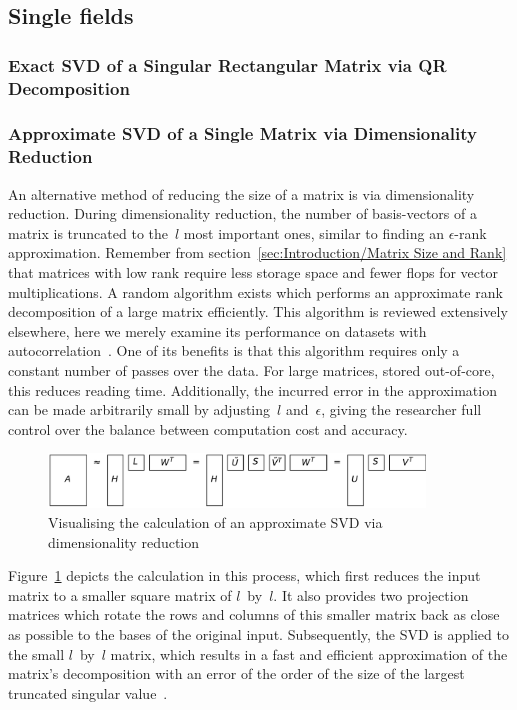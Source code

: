 \documentclass[ijgi,article,submit,moreauthors,pdftex,10pt,a4paper]{Definitions/mdpi}
\begin{document}
\subsection{Single fields}

\subsubsection{Exact SVD of a Singular Rectangular Matrix via QR Decomposition}

\subsubsection{Approximate SVD of a Single Matrix via Dimensionality Reduction}
\label{sec:Results/Approximate SVD of a Single Matrix via Dimensionality Reduction}
An alternative method of reducing the size of a matrix is via dimensionality reduction. During dimensionality reduction, the number of basis-vectors of a matrix is truncated to the~$l$ most important ones, similar to finding an $\epsilon$-rank approximation. Remember from section~\ref{sec:Introduction/Matrix Size and Rank} that matrices with low rank require less storage space and fewer flops for vector multiplications. A random algorithm exists which performs an approximate rank decomposition of a large matrix efficiently. This algorithm is reviewed extensively elsewhere, here we merely examine its performance on datasets with autocorrelation~\cite{Halko2011, Li2016}. One of its benefits is that this algorithm requires only a constant number of passes over the data. For large matrices, stored out-of-core, this reduces reading time. Additionally, the incurred error in the approximation can be made arbitrarily small by adjusting~$l$ and~$\epsilon$, giving the researcher full control over the balance between computation cost and accuracy.

\begin{figure}[H]
\centering
\includegraphics[width=100mm]{Results/reduceSizeRandomisedSquare.pdf}
\caption[Approximate randomised SVD]{Visualising the calculation of an approximate SVD via dimensionality reduction}
\label{fig:reduceSizeRandomisedSquare}
\end{figure}

Figure~\ref{fig:reduceSizeRandomisedSquare} depicts the calculation in this process, which first reduces the input matrix to a smaller square matrix of $l$~by~$l$. It also provides two projection matrices which rotate the rows and columns of this smaller matrix back as close as possible to the bases of the original input. Subsequently, the SVD is applied to the small $l$~by~$l$ matrix, which results in a fast and efficient approximation of the matrix's decomposition with an error of the order of the size of the largest truncated singular value~\cite{Martinsson2016, Halko2011}.
\end{document}
